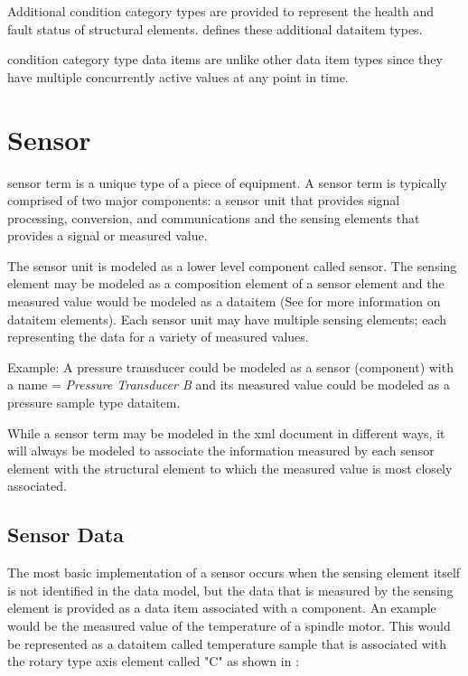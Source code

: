 Additional \gls{condition category} types are provided to represent the health and fault status of \glspl{structural element}.  defines these additional \gls{dataitem} types.

\gls{condition category} type data items are unlike other data item types since they \may have multiple concurrently active values at any point in time.  



\section{Sensor}
\label{sec:Sensors}

\gls{sensor term} is a unique type of a piece of equipment.  A \gls{sensor term} is typically comprised of two major components: a \gls{sensor unit} that provides signal processing, conversion, and communications and the \glspl{sensing element} that provides a signal or measured value.

The \gls{sensor unit} is modeled as a \gls{lower level} \gls{component} called \gls{sensor}.  The \gls{sensing element} may be modeled as a \gls{composition} element of a \gls{sensor} element and the measured value would be modeled as a \gls{dataitem} (See  for more information on \gls{dataitem} elements).  Each \gls{sensor unit} may have multiple \glspl{sensing element}; each representing the data for a variety of measured values.

Example:  A pressure transducer could be modeled as a \gls{sensor} (\gls{component}) with a \gls{name} = \textit{Pressure Transducer B} and its measured value could be modeled as a \gls{pressure sample} type \gls{dataitem}.

While a \gls{sensor term} may be modeled in the \gls{xml} document in different ways, it will always be modeled to associate the information measured by each \gls{sensor element} with the \gls{structural element} to which the measured value is most closely associated.   

\subsection{Sensor Data}

The most basic implementation of a sensor occurs when the \gls{sensing element} itself is not identified in the data model, but the data that is measured by the \gls{sensing element} is provided as a data item associated with a \gls{component}.  An example would be the measured value of the temperature of a spindle motor.  This would be represented as a \gls{dataitem} called \gls{temperature sample} that is associated with the \gls{rotary} type axis element called "C" as shown in :

